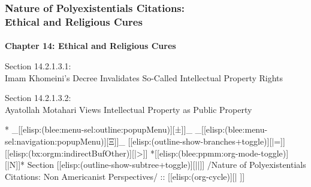 \begin{whenOrg}
\begin{verblatex}

\begin{frame}[fragile,plain,label=citation_ethicalCures]
    \frametitle{Nature of Polyexistentials Citations:\\ Ethical and Religious Cures}
    \framesubtitle{}


    \begin{center}
      \begin{large}
        \textbf{Chapter 14: Ethical and Religious Cures}
      \end{large}
  \end{center}

    \bigskip

  \begin{large}
Section 14.2.1.3.1:\\[10pt] Imam Khomeini's Decree Invalidates So-Called Intellectual Property Rights
  \end{large}

    \bigskip

  \begin{large}
Section 14.2.1.3.2:\\[10pt] Ayatollah Motahari Views Intellectual Property as Public Property
  \end{large}



\end{frame}
\end{verblatex}



\begin{whenOrg}
*  _[[elisp:(blee:menu-sel:outline:popupMenu)][±]]_ _[[elisp:(blee:menu-sel:navigation:popupMenu)][Ξ]]_ [[elisp:(outline-show-branches+toggle)][|=]] [[elisp:(bx:orgm:indirectBufOther)][|>]] *[[elisp:(blee:ppmm:org-mode-toggle)][|N]]*  Section    [[elisp:(outline-show-subtree+toggle)][||]]   /Nature of Polyexistentials Citations: Non Americanist Perspectives/ ::  [[elisp:(org-cycle)][| ]]
\end{whenOrg}


\end{whenOrg}
